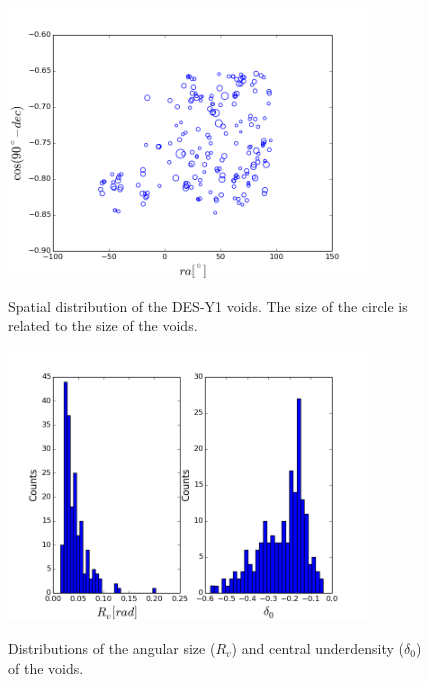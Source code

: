 \begin{figure}
\begin{center}
\includegraphics[width=0.85\textwidth]{./figures_y1/voids_footprint.png}
\caption{Spatial distribution of the DES-Y1 voids. The size of the circle is related to the size of the voids.}
\label{fig:footprint_voids}
\includegraphics[width=0.85\textwidth]{./figures_y1/voids_prop.png}
\caption{Distributions of the angular size ($R_v$) and central underdensity ($\delta_0$) of the voids.}
\label{fig:prop_voids}
\end{center}
\end{figure}

